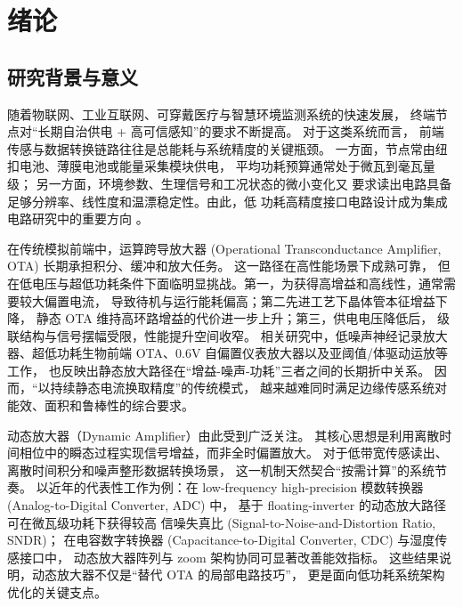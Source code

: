 \section{绪论}

\subsection{研究背景与意义}

随着物联网、工业互联网、可穿戴医疗与智慧环境监测系统的快速发展，
终端节点对“长期自治供电 + 高可信感知”的要求不断提高。
对于这类系统而言，
前端传感与数据转换链路往往是总能耗与系统精度的关键瓶颈。
一方面，节点常由纽扣电池、薄膜电池或能量采集模块供电，
平均功耗预算通常处于微瓦到毫瓦量级；
另一方面，环境参数、生理信号和工况状态的微小变化又
要求读出电路具备足够分辨率、线性度和温漂稳定性。由此，低
功耗高精度接口电路设计成为集成电路研究中的重要方向
\cite{tang2020zoomcdc,li2021humidityarray,li2024crcls}。

在传统模拟前端中，运算跨导放大器 (Operational Transconductance Amplifier, OTA) 长期承担积分、缓冲和放大任务。
这一路径在高性能场景下成熟可靠，
但在低电压与超低功耗条件下面临明显挑战。第一，为获得高增益和高线性，通常需要较大偏置电流，
导致待机与运行能耗偏高；第二先进工艺下晶体管本征增益下降，
静态 OTA 维持高环路增益的代价进一步上升；第三，供电电压降低后，
级联结构与信号摆幅受限，性能提升空间收窄。
相关研究中，低噪声神经记录放大器、超低功耗生物前端 OTA、0.6V 自偏置仪表放大器以及亚阈值/体驱动运放等工作，
也反映出静态放大路径在“增益-噪声-功耗”三者之间的长期折中关系\cite{harrison2003neuralamp,chaya2020ultralowota,mukherjee2022ultralowia,rajagopal2023subthresholdopamp,tai2006bulkdrivenopamp}。
因而，“以持续静态电流换取精度”的传统模式，
越来越难同时满足边缘传感系统对能效、面积和鲁棒性的综合要求。

动态放大器（Dynamic Amplifier）由此受到广泛关注。
其核心思想是利用离散时间相位中的瞬态过程实现信号增益，而非全时偏置放大。
对于低带宽传感读出、离散时间积分和噪声整形数据转换场景，
这一机制天然契合“按需计算”的系统节奏。
以近年的代表性工作为例：在 low-frequency high-precision 模数转换器 (Analog-to-Digital Converter, ADC) 中，
基于 floating-inverter 的动态放大路径可在微瓦级功耗下获得较高
信噪失真比 (Signal-to-Noise-and-Distortion Ratio, SNDR)\cite{wang2021sefiamod,meng2023jssc_mash}；
在电容数字转换器 (Capacitance-to-Digital Converter, CDC) 与湿度传感接口中，
动态放大器阵列与 zoom 架构协同可显著改善能效指标\cite{li2021humidityarray,tang2020zoomcdc}。
这些结果说明，动态放大器不仅是“替代 OTA 的局部电路技巧”，
更是面向低功耗系统架构优化的关键支点。

